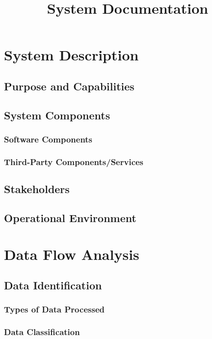 \documentclass{article}
\title{System Documentation}
\author{}
\date{}
\begin{document}
\maketitle

\section{System Description}

\subsection{Purpose and Capabilities}

\subsection{System Components}

\subsubsection{Software Components}

\subsubsection{Third-Party Components/Services}

\subsection{Stakeholders}

\subsection{Operational Environment}

\section{Data Flow Analysis}

\subsection{Data Identification}
\subsubsection{Types of Data Processed}

\subsubsection{Data Classification}
\end{document}

